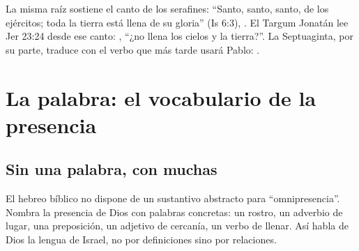 La misma raíz sostiene el canto de los serafines: ``Santo, santo, santo, \SENOR{} de los ejércitos; toda la tierra está llena de su gloria'' (Is 6:3), . El Targum Jonatán lee Jer 23:24 desde ese canto: , ``¿no llena  los cielos y la tierra?''. La Septuaginta, por su parte, traduce con el verbo que más tarde usará Pablo: .


\section{La palabra: el vocabulario de la presencia}

\subsection{Sin una palabra, con muchas}

El hebreo bíblico no dispone de un sustantivo abstracto para ``omnipresencia''. Nombra la presencia de Dios con palabras concretas: un rostro, un adverbio de lugar, una preposición, un adjetivo de cercanía, un verbo de llenar. Así habla de Dios la lengua de Israel, no por definiciones sino por relaciones.

